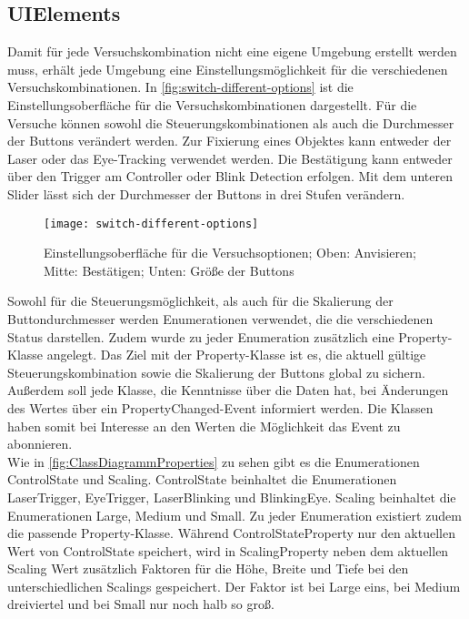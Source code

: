 \subsection{UIElements}
Damit für jede Versuchskombination nicht eine eigene Umgebung erstellt werden muss, erhält jede Umgebung eine Einstellungsmöglichkeit für die verschiedenen Versuchskombinationen. In \autoref{fig:switch-different-options} ist die Einstellungsoberfläche für die Versuchskombinationen dargestellt. Für die Versuche können sowohl die Steuerungskombinationen als auch die Durchmesser der Buttons verändert werden. Zur Fixierung eines Objektes kann entweder der Laser oder das Eye-Tracking verwendet werden. Die Bestätigung kann entweder über den Trigger am Controller oder Blink Detection erfolgen. Mit dem unteren Slider lässt sich der Durchmesser der Buttons in drei Stufen verändern.

\begin{figure}[!htbp]
	\centering
	\texttt{[image: switch-different-options]}
	\caption[Einstellungsoberfläche für die Versuchsoptionen]{Einstellungsoberfläche für die Versuchsoptionen; Oben: Anvisieren; Mitte: Bestätigen; Unten: Größe der Buttons}
	\label{fig:switch-different-options}
\end{figure}

Sowohl für die Steuerungsmöglichkeit, als auch für die Skalierung der Buttondurchmesser werden Enumerationen verwendet, die die verschiedenen Status darstellen. Zudem wurde zu jeder Enumeration zusätzlich eine Property-Klasse angelegt. Das Ziel mit der Property-Klasse ist es, die aktuell gültige Steuerungskombination sowie die Skalierung der Buttons global zu sichern. Außerdem soll jede Klasse, die Kenntnisse über die Daten hat, bei Änderungen des Wertes über ein PropertyChanged-Event informiert werden. Die Klassen haben somit bei Interesse an den Werten die Möglichkeit das Event zu abonnieren. \\
Wie in \autoref{fig:ClassDiagrammProperties} zu sehen gibt es die Enumerationen {\ttfamily ControlState} und {\ttfamily Scaling}. ControlState beinhaltet die Enumerationen LaserTrigger, EyeTrigger, LaserBlinking und BlinkingEye. Scaling beinhaltet die Enumerationen Large, Medium und Small. Zu jeder Enumeration existiert zudem die passende Property-Klasse. Während {\ttfamily ControlStateProperty} nur den aktuellen Wert von ControlState speichert, wird in {\ttfamily ScalingProperty} neben dem aktuellen Scaling Wert zusätzlich Faktoren für die Höhe, Breite und Tiefe bei den unterschiedlichen Scalings gespeichert. Der Faktor ist bei Large eins, bei Medium dreiviertel und bei Small nur noch halb so groß.

